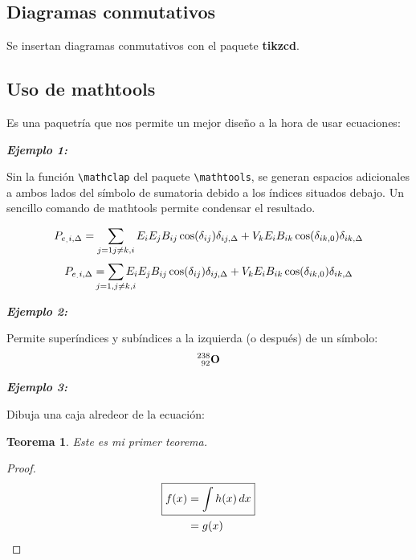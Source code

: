 \documentclass[10pt]{book}
\theoremstyle{definition}
\theoremstyle{plain}
\newtheorem{teo}[defi]{Teorema}
\theoremstyle{remark}
\begin{document}
\subsection{Diagramas conmutativos}
Se insertan diagramas conmutativos con el paquete {\bfseries {\sffamily tikzcd}}.




\subsection{Uso de mathtools}
Es una paquetría que nos permite un mejor diseño a la hora de usar ecuaciones:

{\bfseries\itshape Ejemplo 1:}


Sin la función \verb+\mathclap+ del paquete \verb+\mathtools+, se generan espacios adicionales a ambos lados del símbolo de sumatoria debido a los índices situados debajo. Un sencillo comando de mathtools permite condensar el resultado.



\[
P_{e_,{}i,\Delta} = \sum_{{j=1 \\ j\neq k,i}} E_i E_j B_{ij} \cos(\delta_{ij}) \delta_{ij,\Delta} + V_k E_i B_{ik} \cos(\delta_{ik,0}) \delta_{ik,\Delta}
\]
\[
P_{e_.i,\Delta} = \sum_{\mathclap{j=1, j\neq k, i}} E_i E_j B_{ij} \cos(\delta_{ij}) \delta_{ij,\Delta} + V_k E_i B_{ik} \cos(\delta_{ik,0}) \delta_{ik,\Delta}
\]


{\bfseries\itshape Ejemplo 2:}

Permite superíndices y subíndices a la izquierda (o después) de un símbolo:
\[
\prescript{238}{92}{\mathbf{O}}
\]


{\bfseries\itshape Ejemplo 3:}

Dibuja una caja alredeor de la ecuación:

\begin{teo}
    Este es mi primer teorema.
\end{teo}
\begin{proof}
    \begin{align*}
\Aboxed{ f(x) & = \int h(x)\, dx} \\
              & = g(x)
\end{align*}
\end{proof}




\nocite{*}

\printbibliography[heading=bibintoc]

\printindex
\end{document}
